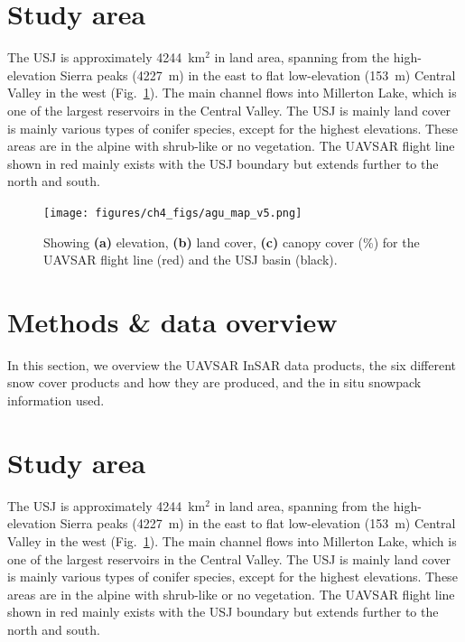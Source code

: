 \hypertarget{ch4-methods}{\section{Study area}\label{ch4-methods}}

The USJ is approximately 4244~km$^{2}$ in land area, spanning from the high-elevation Sierra peaks (4227~m) in the east to flat low-elevation (153~m) Central Valley in the west (Fig.~\ref{fig:multisensor_study_area}). The main channel flows into Millerton Lake, which is one of the largest reservoirs in the Central Valley. The USJ is mainly land cover is mainly various types of conifer species, except for the highest elevations. These areas are in the alpine with shrub-like or no vegetation. The UAVSAR flight line shown in red mainly exists with the USJ boundary but extends further to the north and south.

\begin{figure}[ht]
\texttt{[image: figures/ch4\_figs/agu\_map\_v5.png]}
\centering
\caption{Showing \textbf{(a)} elevation, \textbf{(b)} land cover, \textbf{(c)} canopy cover (\%) for the UAVSAR flight line (red) and the USJ basin (black).}
\label{fig:multisensor_study_area}
\end{figure}
\clearpage

\hypertarget{ch4-methods}{\section{Methods \& data overview}\label{ch4-methods}}

In this section, we overview the UAVSAR InSAR data products, the six different snow cover products and how they are produced, and the in situ snowpack information used.

\hypertarget{ch4-methods}{\section{Study area}\label{ch4-methods}}

The USJ is approximately 4244~km$^{2}$ in land area, spanning from the high-elevation Sierra peaks (4227~m) in the east to flat low-elevation (153~m) Central Valley in the west (Fig.~\ref{fig:multisensor_study_area}). The main channel flows into Millerton Lake, which is one of the largest reservoirs in the Central Valley. The USJ is mainly land cover is mainly various types of conifer species, except for the highest elevations. These areas are in the alpine with shrub-like or no vegetation. The UAVSAR flight line shown in red mainly exists with the USJ boundary but extends further to the north and south.

